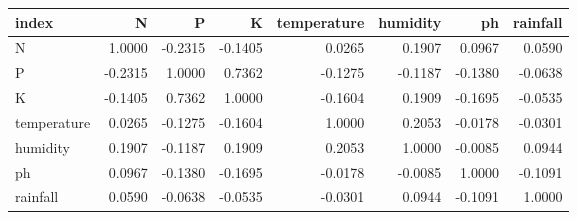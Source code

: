 \begin{tabular}{lrrrrrrr}
\toprule
index & N & P & K & temperature & humidity & ph & rainfall \\
\midrule
N & 1.0000 & -0.2315 & -0.1405 & 0.0265 & 0.1907 & 0.0967 & 0.0590 \\
P & -0.2315 & 1.0000 & 0.7362 & -0.1275 & -0.1187 & -0.1380 & -0.0638 \\
K & -0.1405 & 0.7362 & 1.0000 & -0.1604 & 0.1909 & -0.1695 & -0.0535 \\
temperature & 0.0265 & -0.1275 & -0.1604 & 1.0000 & 0.2053 & -0.0178 & -0.0301 \\
humidity & 0.1907 & -0.1187 & 0.1909 & 0.2053 & 1.0000 & -0.0085 & 0.0944 \\
ph & 0.0967 & -0.1380 & -0.1695 & -0.0178 & -0.0085 & 1.0000 & -0.1091 \\
rainfall & 0.0590 & -0.0638 & -0.0535 & -0.0301 & 0.0944 & -0.1091 & 1.0000 \\
\bottomrule
\end{tabular}
